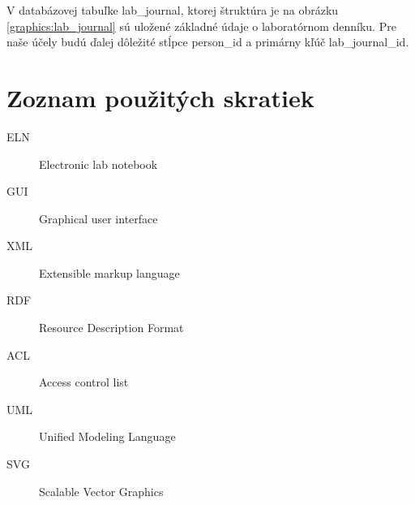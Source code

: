 \documentclass[thesis=M,slovak]{FITthesis}[2013/05/06]
\begin{document}
V databázovej tabuľke lab\_journal, ktorej štruktúra je na obrázku \ref{graphics:lab_journal} sú uložené základné údaje o laboratórnom denníku. Pre naše účely budú ďalej dôležité stĺpce person\_id a primárny kľúč lab\_journal\_id.


\begin{conclusion}
\end{conclusion}




\appendix

\chapter{Zoznam použitých skratiek}
\begin{description}
	\item[ELN] Electronic lab notebook
	\item[GUI] Graphical user interface
	\item[XML] Extensible markup language
	\item[RDF] Resource Description Format
	\item[ACL] Access control list
	\item[UML] Unified Modeling Language
	\item[SVG] Scalable Vector Graphics
\end{description}
\end{document}
